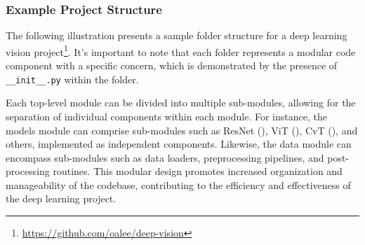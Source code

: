 \documentclass{article}
\begin{document}
\subsubsection{Example Project Structure}

The following illustration presents a sample folder structure for a deep learning vision project\footnote{ \url{https://github.com/oalee/deep-vision}}. It's important to note that each folder represents a modular code component with a specific concern, which is demonstrated by the presence of \verb|__init__.py| within the folder.

\vspace{2em}
Each top-level module can be divided into multiple sub-modules, allowing for the separation of individual components within each module. For instance, the models module can comprise sub-modules such as ResNet (\cite{resnet}), ViT (\cite{dosovitskiy2020vit}), CvT (\cite{wu2021cvt}), and others, implemented as independent components. Likewise, the data module can encompass sub-modules such as data loaders, preprocessing pipelines, and post-processing routines. This modular design promotes increased organization and manageability of the codebase, contributing to the efficiency and effectiveness of the deep learning project.
\end{document}
